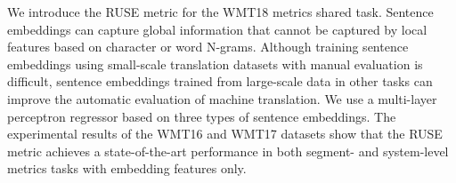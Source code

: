 We introduce the RUSE metric for the WMT18 metrics shared task. Sentence embeddings can capture global information that cannot be captured by local features based on character or word N-grams. Although training sentence embeddings using small-scale translation datasets with manual evaluation is difficult, sentence embeddings trained from large-scale data in other tasks can improve the automatic evaluation of machine translation. We use a multi-layer perceptron regressor based on three types of sentence embeddings. The experimental results of the WMT16 and WMT17 datasets show that the RUSE metric achieves a state-of-the-art performance in both segment- and system-level metrics tasks with embedding features only.
